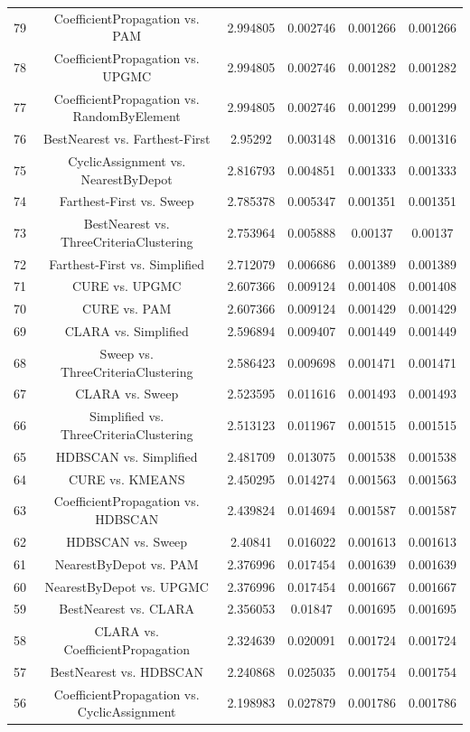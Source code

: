 \documentclass[a4paper,10pt]{article}
\begin{document}
\begin{landscape}
\begin{table}[!htp]
\begin{tabular}{cccccc}
79&CoefficientPropagation vs. PAM&2.994805&0.002746&0.001266&0.001266\\
78&CoefficientPropagation vs. UPGMC&2.994805&0.002746&0.001282&0.001282\\
77&CoefficientPropagation vs. RandomByElement&2.994805&0.002746&0.001299&0.001299\\
76&BestNearest vs. Farthest-First&2.95292&0.003148&0.001316&0.001316\\
75&CyclicAssignment vs. NearestByDepot&2.816793&0.004851&0.001333&0.001333\\
74&Farthest-First vs. Sweep&2.785378&0.005347&0.001351&0.001351\\
73&BestNearest vs. ThreeCriteriaClustering&2.753964&0.005888&0.00137&0.00137\\
72&Farthest-First vs. Simplified&2.712079&0.006686&0.001389&0.001389\\
71&CURE vs. UPGMC&2.607366&0.009124&0.001408&0.001408\\
70&CURE vs. PAM&2.607366&0.009124&0.001429&0.001429\\
69&CLARA vs. Simplified&2.596894&0.009407&0.001449&0.001449\\
68&Sweep vs. ThreeCriteriaClustering&2.586423&0.009698&0.001471&0.001471\\
67&CLARA vs. Sweep&2.523595&0.011616&0.001493&0.001493\\
66&Simplified vs. ThreeCriteriaClustering&2.513123&0.011967&0.001515&0.001515\\
65&HDBSCAN vs. Simplified&2.481709&0.013075&0.001538&0.001538\\
64&CURE vs. KMEANS&2.450295&0.014274&0.001563&0.001563\\
63&CoefficientPropagation vs. HDBSCAN&2.439824&0.014694&0.001587&0.001587\\
62&HDBSCAN vs. Sweep&2.40841&0.016022&0.001613&0.001613\\
61&NearestByDepot vs. PAM&2.376996&0.017454&0.001639&0.001639\\
60&NearestByDepot vs. UPGMC&2.376996&0.017454&0.001667&0.001667\\
59&BestNearest vs. CLARA&2.356053&0.01847&0.001695&0.001695\\
58&CLARA vs. CoefficientPropagation&2.324639&0.020091&0.001724&0.001724\\
57&BestNearest vs. HDBSCAN&2.240868&0.025035&0.001754&0.001754\\
56&CoefficientPropagation vs. CyclicAssignment&2.198983&0.027879&0.001786&0.001786\\

\end{tabular}
\end{table}
\end{landscape}
\end{document}
